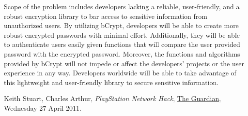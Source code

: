 \documentclass[12pt]{article}
\begin{document}
	Scope of the problem includes developers lacking a reliable, user-friendly, and a robust encryption library to bar access to sensitive information from unauthorized users. By utilizing bCrypt, developers will be able to create more robust encrypted passwords with minimal effort. Additionally, they will be able to authenticate users easily given functions that will compare the user provided password with the encrypted password. Moreover, the functions and algorithms provided by bCrypt will not impede or affect the developers’ projects or the user experience in any way. Developers worldwide will be able to take advantage of this lightweight and user-friendly library to secure sensitive information.


\begin{thebibliography}{1}

	Keith Stuart, Charles Arthur,
  \emph{PlayStation Network Hack},
  \href{http://www.theguardian.com/technology/gamesblog/2011/apr/27/playstation-network-hack-sony}{The Guardian},
  Wednesday 27 April 2011.

\end{thebibliography}
\end{document}
